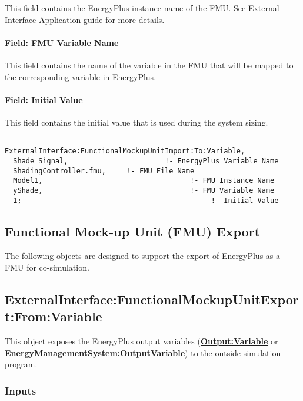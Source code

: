 This field contains the EnergyPlus instance name of the FMU. See External Interface Application guide for more details.

\paragraph{Field: FMU Variable Name}\label{field-fmu-variable-name-3}

This field contains the name of the variable in the FMU that will be mapped to the corresponding variable in EnergyPlus.

\paragraph{Field: Initial Value}\label{field-initial-value-5}

This field contains the initial value that is used during the system sizing.

\begin{lstlisting}

ExternalInterface:FunctionalMockupUnitImport:To:Variable,
  Shade_Signal,                       !- EnergyPlus Variable Name
  ShadingController.fmu,     !- FMU File Name
  Model1,                                   !- FMU Instance Name
  yShade,                                   !- FMU Variable Name
  1;                                             !- Initial Value
\end{lstlisting}

\subsection{Functional Mock-up Unit (FMU) Export}\label{functional-mock-up-unit-fmu-export}

The following objects are designed to support the export of EnergyPlus as a FMU for co-simulation.

\subsection{ExternalInterface:FunctionalMockupUnitExport:From:Variable}\label{externalinterfacefunctionalmockupunitexportfromvariable}

This object exposes the EnergyPlus output variables (\textbf{\hyperref[outputvariable]{Output:Variable}} or \textbf{\hyperref[energymanagementsystemoutputvariable]{EnergyManagementSystem:OutputVariable}}) to the outside simulation program.

\subsubsection{Inputs}\label{inputs-9-006}

